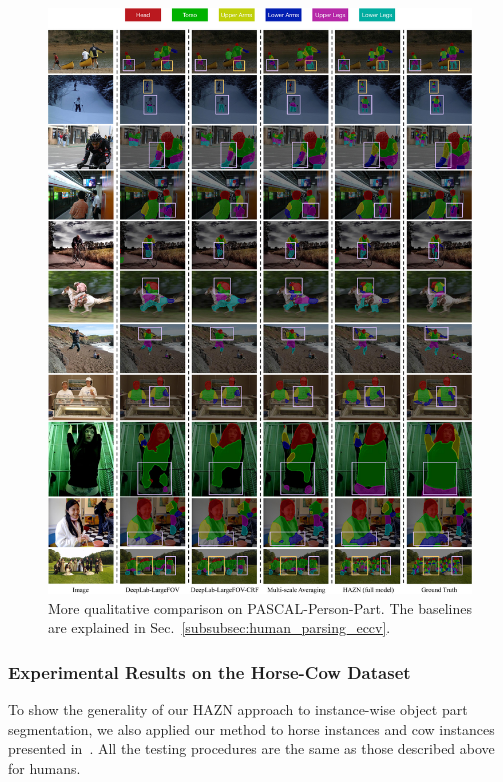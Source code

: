 \begin{figure}
\centering
\hspace*{-0.4cm}
\includegraphics[width=0.95\linewidth]{figs/supplementary_results_eccv.pdf}
\vspace{-1\baselineskip}
\caption{More qualitative comparison on PASCAL-Person-Part. The baselines are explained in Sec.~\ref{subsubsec:human_parsing_eccv}.}
\label{fig:human_res_eccv}
\end{figure}

\subsubsection{Experimental Results on the Horse-Cow Dataset}
\label{subsubsec:horses_eccv}
To show the generality of our HAZN approach to instance-wise object part segmentation,
we also applied our method to horse instances and cow instances presented in~\cite{wang2015semantic}.
All the testing procedures are the same as those described above for humans.

